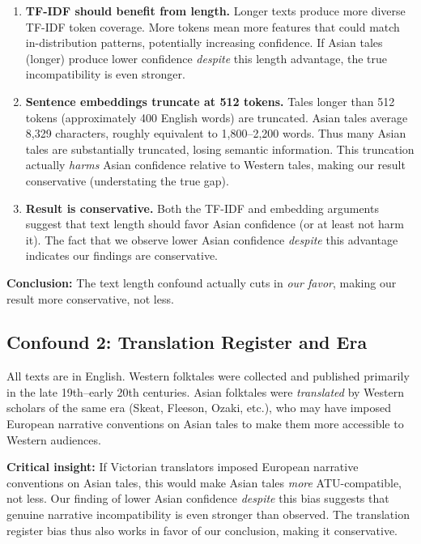 \documentclass{article}
\begin{document}
\begin{enumerate}
\item \textbf{TF-IDF should benefit from length.} Longer texts produce more diverse TF-IDF token coverage. More tokens mean more features that could match in-distribution patterns, potentially increasing confidence. If Asian tales (longer) produce lower confidence \textit{despite} this length advantage, the true incompatibility is even stronger.

\item \textbf{Sentence embeddings truncate at 512 tokens.} Tales longer than 512 tokens (approximately 400 English words) are truncated. Asian tales average 8,329 characters, roughly equivalent to 1,800--2,200 words. Thus many Asian tales are substantially truncated, losing semantic information. This truncation actually \textit{harms} Asian confidence relative to Western tales, making our result conservative (understating the true gap).

\item \textbf{Result is conservative.} Both the TF-IDF and embedding arguments suggest that text length should favor Asian confidence (or at least not harm it). The fact that we observe lower Asian confidence \textit{despite} this advantage indicates our findings are conservative.
\end{enumerate}

\textbf{Conclusion:} The text length confound actually cuts in \textit{our favor}, making our result more conservative, not less.

\subsection{Confound 2: Translation Register and Era}

All texts are in English. Western folktales were collected and published primarily in the late 19th--early 20th centuries. Asian folktales were \textit{translated} by Western scholars of the same era (Skeat, Fleeson, Ozaki, etc.), who may have imposed European narrative conventions on Asian tales to make them more accessible to Western audiences.

\textbf{Critical insight:} If Victorian translators imposed European narrative conventions on Asian tales, this would make Asian tales \textit{more} ATU-compatible, not less. Our finding of lower Asian confidence \textit{despite} this bias suggests that genuine narrative incompatibility is even stronger than observed. The translation register bias thus also works in favor of our conclusion, making it conservative.
\end{document}
